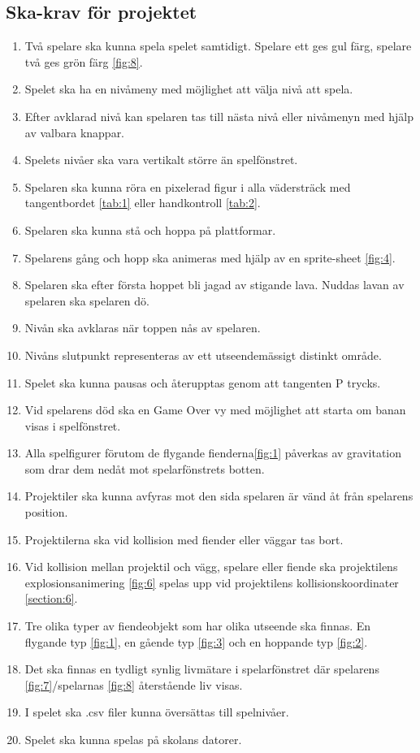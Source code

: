 \documentclass{TDP005mall}
\begin{document}
\subsection{Ska-krav för projektet} %
\begin{enumerate}
\item Två spelare ska kunna spela spelet samtidigt. Spelare ett ges gul färg, spelare två ges grön färg \ref{fig:8}.
\item Spelet ska ha en nivåmeny med möjlighet att välja nivå att spela.
\item Efter avklarad nivå kan spelaren tas till nästa nivå eller nivåmenyn med hjälp av valbara knappar. 
\item Spelets nivåer ska vara vertikalt större än spelfönstret.
\item Spelaren ska kunna röra en pixelerad figur i alla vädersträck med tangentbordet \ref{tab:1} eller handkontroll \ref{tab:2}.
\item Spelaren ska kunna stå och hoppa på plattformar.
\item Spelarens gång och hopp ska animeras med hjälp av en sprite-sheet \ref{fig:4}.
\item Spelaren ska efter första hoppet bli jagad av stigande lava. Nuddas lavan av spelaren ska spelaren dö.
\item Nivån ska avklaras när toppen nås av spelaren.
\item Nivåns slutpunkt representeras av ett utseendemässigt distinkt område.
\item Spelet ska kunna pausas och återupptas genom att tangenten P trycks.
\item Vid spelarens död ska en Game Over vy med möjlighet att starta om banan visas i spelfönstret.
\item Alla spelfigurer förutom de flygande fienderna\ref{fig:1} påverkas av gravitation som drar dem nedåt mot spelarfönstrets botten.
\item Projektiler ska kunna avfyras mot den sida spelaren är vänd åt från spelarens position.
\item Projektilerna ska vid kollision med fiender eller väggar tas bort.
\item Vid kollision mellan projektil och vägg, spelare eller fiende ska projektilens explosionsanimering \ref{fig:6} spelas upp vid projektilens kollisionskoordinater \ref{section:6}.
\item Tre olika typer av fiendeobjekt som har olika utseende ska finnas. En flygande typ \ref{fig:1}, en gående typ \ref{fig:3} och en hoppande typ \ref{fig:2}.
\item Det ska finnas en tydligt synlig livmätare i spelarfönstret där spelarens \ref{fig:7}/spelarnas \ref{fig:8} återstående liv visas.
\item I spelet ska .csv filer kunna översättas till spelnivåer.
\item Spelet ska kunna spelas på skolans datorer.
\end{enumerate}
\end{document}
